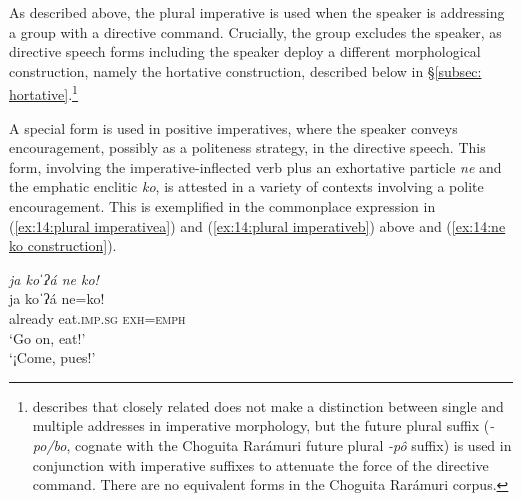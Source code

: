                 \label{ex:14:plural imperatived}
    \z
\z

As described above, the plural imperative is used when the speaker is addressing a group with a directive command. Crucially, the group excludes the speaker, as directive speech forms including the speaker deploy a different morphological construction, namely the hortative construction, described below in §\ref{subsec: hortative}.\footnote{\citet[][110]{miller1996guarijio} describes that closely related  does not make a distinction between single and multiple addresses in imperative morphology, but the future plural suffix (\textit{-po/bo}, cognate with the Choguita Rarámuri future plural \textit{-pô} suffix) is used in conjunction with imperative suffixes to attenuate the force of the  directive command. There are no equivalent forms in the Choguita Rarámuri corpus.}

A special form is used in positive imperatives, where the speaker conveys encouragement, possibly as a politeness strategy, in the directive speech. This form, involving the imperative-inflected verb plus an exhortative particle \textit{ne} and the emphatic enclitic \textit{ko}, is attested in a variety of contexts involving a polite encouragement. This is exemplified in the commonplace expression in (\ref{ex:14:plural imperativea}) and (\ref{ex:14:plural imperativeb}) above and (\ref{ex:14:ne ko construction}).

\ea\label{ex:14:ne ko construction}

    \textit{ja koˈʔá ne ko!}\\
    \gll    ja koˈʔá ne=ko!\\
            already eat.\textsc{imp.sg} \textsc{exh=emph}\\
    \glt    `Go on, eat!'\\
    \glt    `¡Come, pues!'\\


